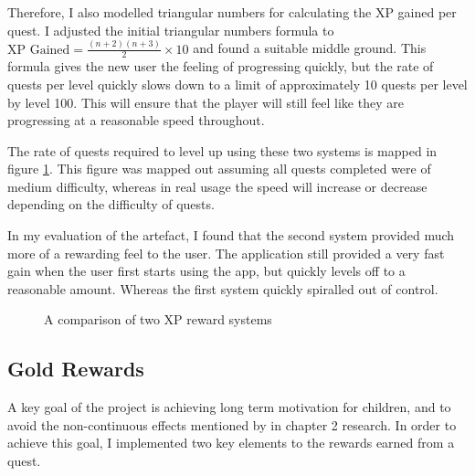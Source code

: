 Therefore, I also modelled triangular numbers for calculating the XP gained per quest. 
I adjusted the initial triangular numbers formula to $\textrm{XP Gained} = \frac{(n+2)(n+3)}{2} \times 10$ and found a suitable middle ground.
This formula gives the new user the feeling of progressing quickly, but the rate of quests per level quickly slows down to a limit of approximately 10 quests per level by level 100.
This will ensure that the player will still feel like they are progressing at a reasonable speed throughout.

The rate of quests required to level up using these two systems is mapped in figure \ref{fig:xprewardcomparison}.
This figure was mapped out assuming all quests completed were of medium difficulty, whereas in real usage the speed will increase or decrease depending on the difficulty of quests.

In my evaluation of the artefact, I found that the second system provided much more of a rewarding feel to the user. 
The application still provided a very fast gain when the user first starts using the app, but quickly levels off to a reasonable amount.
Whereas the first system quickly spiralled out of control.

\begin{figure}
\centering
{}
\caption{A comparison of two XP reward systems}
\label{fig:xprewardcomparison}
\end{figure}

\subsection{Gold Rewards}
A key goal of the project is achieving long term motivation for children, and to avoid the non-continuous effects mentioned by \cite{deci2001extrinsic} in chapter 2 research.
In order to achieve this goal, I implemented two key elements to the rewards earned from a quest.

